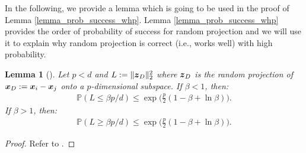 \documentclass{article}
\newtheorem{lemma}{Lemma}
\def\b{\ensuremath\boldsymbol}
\begin{document}
In the following, we provide a lemma which is going to be used in the proof of Lemma \ref{lemma_prob_success_whp}. Lemma \ref{lemma_prob_success_whp} provides the order of probability of success for random projection and we will use it to explain why random projection is correct (i.e., works well) with high probability. 
\begin{lemma}[\cite{dasgupta1999elementary,dasgupta2003elementary}]\label{lemma_P_beta_and_exp}
Let $p<d$ and $L := \|\b{z}_D\|_2^2$ where $\b{z}_D$ is the random projection of $\b{x}_D := \b{x}_i - \b{x}_j$ onto a $p$-dimensional subspace. If $\beta < 1$, then:
\begin{align}\label{equation_P_beta_and_exp_1}
\mathbb{P}(L \leq \beta p/d) \leq \exp\big(\frac{p}{2} (1 - \beta + \ln \beta)\big).
\end{align}
If $\beta > 1$, then:
\begin{align}\label{equation_P_beta_and_exp_2}
\mathbb{P}(L \geq \beta p/d) \leq \exp\big(\frac{p}{2} (1 - \beta + \ln \beta)\big).
\end{align}
\end{lemma}
\begin{proof}
Refer to \cite{dasgupta1999elementary,dasgupta2003elementary}.
\end{proof}
\end{document}
